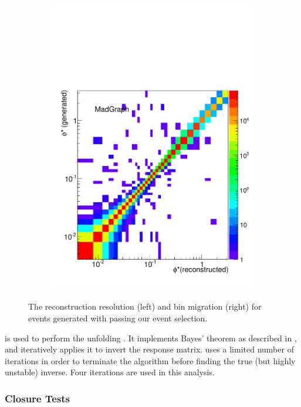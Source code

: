 \begin{figure}[!htbp]
\begin{subfigure}[b]{\SideBySidePlotWidth}
        \includegraphics[width=\textwidth]{figures/BinM_M.pdf}
        \caption{}
        \label{fig:bin_migration_matrix}
    \end{subfigure}
    \caption{
        The \phistar reconstruction resolution (left) and bin migration (right)
        for events generated with \MADGRAPH passing our event selection.
    }
    \label{fig:phistar_resolution_and_bin_migration}
\end{figure}

\RooUnfold is used to perform the unfolding \cite{adye_2011}. It implements
Bayes' theorem as described in \cite{dagostini_1995}, and iteratively applies
it to invert the response matrix. \RooUnfold uses a limited number of
iterations in order to terminate the algorithm before finding the true (but
highly unstable) inverse. Four iterations are used in this analysis.

\subsubsection{Closure Tests}

